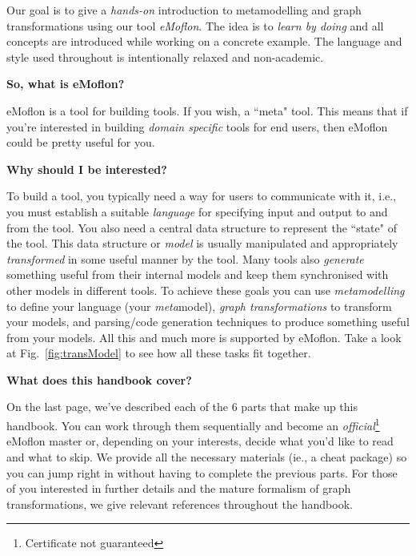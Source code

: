 Our goal is to give a \emph{hands-on} introduction to metamodelling and graph transformations using our tool \emph{eMoflon}. The idea is to \emph{learn by
doing} and all concepts are introduced while working on a concrete example. The language and style used throughout is intentionally relaxed and non-academic.


{\bf \large So, what is eMoflon?}

eMoflon is a tool for building tools. If you wish, a ``meta" tool.  This means that if you're interested in building \emph{domain specific} tools for end users,
then eMoflon could be pretty useful for you.


{\bf \large Why should I be interested?}

To build a tool, you typically need a way for users to communicate with it, i.e., you must establish a suitable \emph{language} for specifying input and output
to and from the tool.  You also need a central data structure to represent the ``state" of the tool.  This data structure or \emph{model} is usually manipulated
and appropriately \emph{transformed} in some useful manner by the tool.  Many tools also \emph{generate} something useful from their internal models and keep
them synchronised with other models in different tools. To achieve these goals you can use \emph{metamodelling} to define your language (your \emph{meta}model),
\emph{graph transformations} to transform your models, and parsing/code generation techniques to produce something useful from your models. All this and much
more is supported by eMoflon. Take a look at Fig.~\ref{fig:transModel} to see how all these tasks fit together.

{\bf \large What does this handbook cover?}


On the last page, we've described each of the 6 parts that make up this handbook. You can work through them sequentially and become an
\emph{official}\footnote{Certificate not guaranteed} eMoflon master or, depending on your interests, decide what you'd like to read and what to skip. We provide
all the necessary materials (ie., a cheat package) so you can jump right in without having to complete the previous parts. For those of you interested in further
details and the mature formalism of graph transformations, we give relevant references throughout the handbook.

\vfill \newpage

